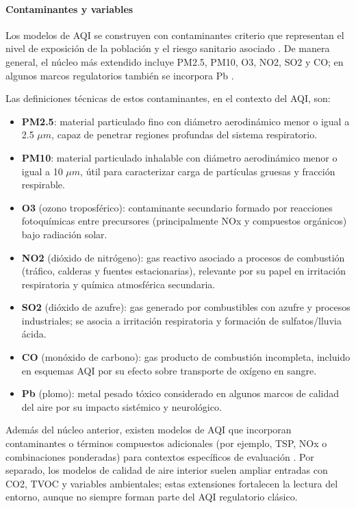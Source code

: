 \paragraph{Contaminantes y variables}
Los modelos de AQI se construyen con contaminantes criterio que representan el nivel de exposición de la población y el riesgo sanitario asociado \cite{ART01,ART02}. De manera general, el núcleo más extendido incluye PM2.5, PM10, O3, NO2, SO2 y CO; en algunos marcos regulatorios también se incorpora Pb \cite{ART01,ART02}.

Las definiciones técnicas de estos contaminantes, en el contexto del AQI, son:
\begin{itemize}
\item \textbf{PM2.5}: material particulado fino con diámetro aerodinámico menor o igual a 2.5 \(\mu m\), capaz de penetrar regiones profundas del sistema respiratorio.
\item \textbf{PM10}: material particulado inhalable con diámetro aerodinámico menor o igual a 10 \(\mu m\), útil para caracterizar carga de partículas gruesas y fracción respirable.
\item \textbf{O3} (ozono troposférico): contaminante secundario formado por reacciones fotoquímicas entre precursores (principalmente NOx y compuestos orgánicos) bajo radiación solar.
\item \textbf{NO2} (dióxido de nitrógeno): gas reactivo asociado a procesos de combustión (tráfico, calderas y fuentes estacionarias), relevante por su papel en irritación respiratoria y química atmosférica secundaria.
\item \textbf{SO2} (dióxido de azufre): gas generado por combustibles con azufre y procesos industriales; se asocia a irritación respiratoria y formación de sulfatos/lluvia ácida.
\item \textbf{CO} (monóxido de carbono): gas producto de combustión incompleta, incluido en esquemas AQI por su efecto sobre transporte de oxígeno en sangre.
\item \textbf{Pb} (plomo): metal pesado tóxico considerado en algunos marcos de calidad del aire por su impacto sistémico y neurológico.
\end{itemize}

Además del núcleo anterior, existen modelos de AQI que incorporan contaminantes o términos compuestos adicionales (por ejemplo, TSP, NOx o combinaciones ponderadas) para contextos específicos de evaluación \cite{ART01,ART02}. Por separado, los modelos de calidad de aire interior suelen ampliar entradas con CO2, TVOC y variables ambientales; estas extensiones fortalecen la lectura del entorno, aunque no siempre forman parte del AQI regulatorio clásico.

